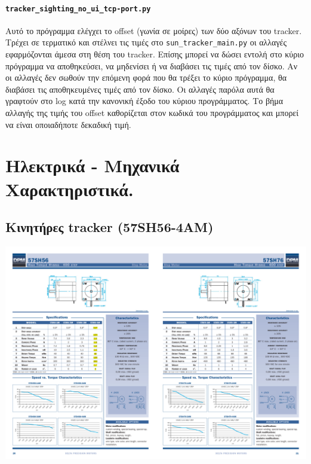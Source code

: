 \documentclass[
  a4paper,
  twoside,
  titlepage,
  11pt]{article}
\numberwithin{equation}{section}
\numberwithin{figure}{section}
\numberwithin{table}{section}
\begin{document}
\hypertarget{tracker_sighting_no_ui_tcp-port.py}{%
\paragraph{\texorpdfstring{\texttt{tracker\_sighting\_no\_ui\_tcp-port.py}}{tracker\_sighting\_no\_ui\_tcp-port.py}}\label{tracker_sighting_no_ui_tcp-port.py}}

Αυτό το πρόγραμμα ελέγχει το offset (γωνία σε μοίρες) των δύο αξόνων του tracker. Τρέχει σε τερματικό και στέλνει τις τιμές στο \texttt{sun\_tracker\_main.py} οι αλλαγές εφαρμόζονται άμεσα στη θέση του tracker. Επίσης μπορεί να δώσει εντολή στο κύριο πρόγραμμα να αποθηκεύσει, να μηδενίσει ή να διαβάσει τις τιμές από τον δίσκο. Αν οι αλλαγές δεν σωθούν την επόμενη φορά που θα τρέξει το κύριο πρόγραμμα, θα διαβάσει τις αποθηκευμένες τιμές από τον δίσκο. Οι αλλαγές παρόλα αυτά θα γραφτούν στο log κατά την κανονική έξοδο του κύριου προγράμματος. Το βήμα αλλαγής της τιμής του offset καθορίζεται στον κωδικά του προγράμματος και μπορεί να είναι οποιαδήποτε δεκαδική τιμή.

\hypertarget{ux3b7ux3bbux3b5ux3baux3c4ux3c1ux3b9ux3baux3ac---ux3bcux3b7ux3c7ux3b1ux3bdux3b9ux3baux3ac-ux3c7ux3b1ux3c1ux3b1ux3baux3c4ux3b7ux3c1ux3b9ux3c3ux3c4ux3b9ux3baux3ac.}{%
\section{Ηλεκτρικά - Μηχανικά Χαρακτηριστικά.}\label{ux3b7ux3bbux3b5ux3baux3c4ux3c1ux3b9ux3baux3ac---ux3bcux3b7ux3c7ux3b1ux3bdux3b9ux3baux3ac-ux3c7ux3b1ux3c1ux3b1ux3baux3c4ux3b7ux3c1ux3b9ux3c3ux3c4ux3b9ux3baux3ac.}}

\hypertarget{ux3baux3b9ux3bdux3b7ux3c4ux3aeux3c1ux3b5ux3c2-tracker-57sh56-4am}{%
\subsection{Κινητήρες tracker (57SH56-4AM)}\label{ux3baux3b9ux3bdux3b7ux3c4ux3aeux3c1ux3b5ux3c2-tracker-57sh56-4am}}

\begin{center}\includegraphics[width=.94\linewidth]{./files/57SH56-4AM_400_STEP} \end{center}
\end{document}
